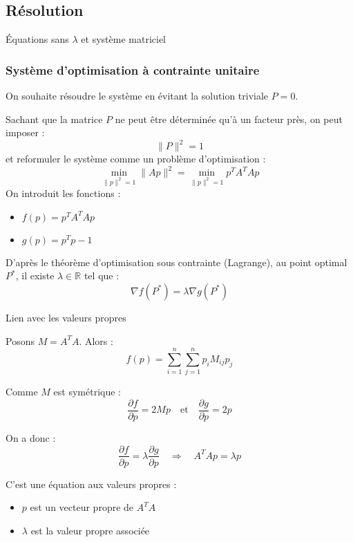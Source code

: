 \subsection{Résolution}
\begin{frame}{Équations sans \(\lambda\) et système matriciel}
  
\end{frame}

\begin{frame}
\frametitle{Système d’optimisation à contrainte unitaire}

On souhaite résoudre le système en évitant la solution triviale \( P = 0 \).  
\pause

Sachant que la matrice \( P \) ne peut être déterminée qu’à un facteur près, on peut imposer :
\[
\|P\|^2 = 1
\]
et reformuler le système comme un problème d’optimisation :
\pause
\[
\min_{\|p\|^2 = 1} \|Ap\|^2 = \min_{\|p\|^2 = 1} p^T A^T A p
\]
\pause
On introduit les fonctions :
\begin{itemize}
  \item \( f(p) = p^T A^T A p \)
  \item \( g(p) = p^T p - 1 \)
\end{itemize}
\pause
D’après le théorème d’optimisation sous contrainte (Lagrange), au point optimal \( P^* \), il existe \( \lambda \in \mathbb{R} \) tel que :
\[
\nabla f(P^*) = \lambda \nabla g(P^*)
\]
\end{frame}


\begin{frame}{Lien avec les valeurs propres}

Posons \( M = A^T A \).  
Alors :
\[
f(p) = \sum_{i=1}^n \sum_{j=1}^n p_i M_{ij} p_j
\]
\pause

Comme \( M \) est symétrique :
\[
\frac{\partial f}{\partial p} = 2Mp
\quad \text{et} \quad
\frac{\partial g}{\partial p} = 2p
\]
\pause

On a donc :
\[
\frac{\partial f}{\partial p} = \lambda \frac{\partial g}{\partial p}
\quad \Rightarrow \quad
\boxed{A^T A p = \lambda p}
\]
\pause

C’est une équation aux valeurs propres :
\begin{itemize}
  \item \( p \) est un vecteur propre de \( A^T A \)
  \item \( \lambda \) est la valeur propre associée
\end{itemize}
\end{frame}


